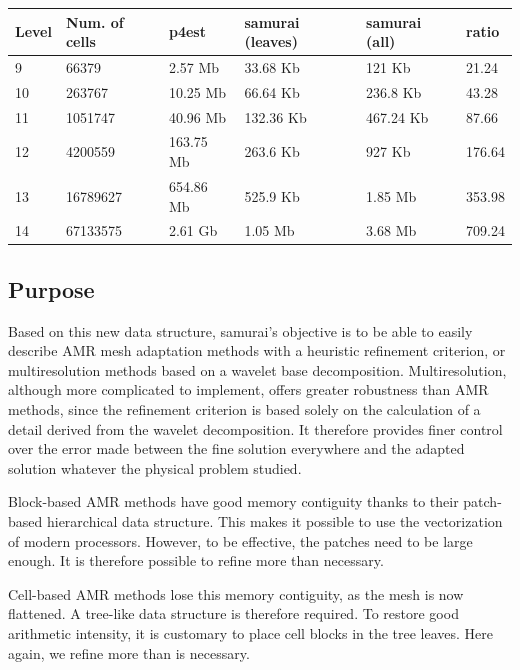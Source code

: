 \begin{table}[h!]
    \centering
    \begin{tabular}{llllll}
        \textbf{Level} & \textbf{Num. of cells} & \textbf{p4est} & \textbf{samurai (leaves)} & \textbf{samurai (all)} & \textbf{ratio} \\
        \hline\hline
        9 & 66379 & 2.57 Mb & 33.68 Kb & 121 Kb & 21.24 \\
        10 & 263767 & 10.25 Mb & 66.64 Kb & 236.8 Kb & 43.28 \\
        11 & 1051747 & 40.96 Mb & 132.36 Kb & 467.24 Kb & 87.66 \\
        12 & 4200559 & 163.75 Mb & 263.6 Kb & 927 Kb & 176.64 \\
        13 & 16789627 & 654.86 Mb & 525.9 Kb & 1.85 Mb & 353.98 \\
        14 & 67133575 & 2.61 Gb & 1.05 Mb & 3.68 Mb & 709.24 \\
    \end{tabular}
\end{table}

\subsection{Purpose}
\label{sec:Samurai:purpose}

Based on this new data structure, samurai's objective is to be able to easily describe AMR mesh adaptation methods with a heuristic refinement criterion, or multiresolution methods based on a wavelet base decomposition. Multiresolution, although more complicated to implement, offers greater robustness than AMR methods, since the refinement criterion is based solely on the calculation of a detail derived from the wavelet decomposition. It therefore provides finer control over the error made between the fine solution everywhere and the adapted solution whatever the physical problem studied.

Block-based AMR methods have good memory contiguity thanks to their patch-based hierarchical data structure. This makes it possible to use the vectorization of modern processors. However, to be effective, the patches need to be large enough. It is therefore possible to refine more than necessary.

Cell-based AMR methods lose this memory contiguity, as the mesh is now flattened. A tree-like data structure is therefore required. To restore good arithmetic intensity, it is customary to place cell blocks in the tree leaves. Here again, we refine more than is necessary.

